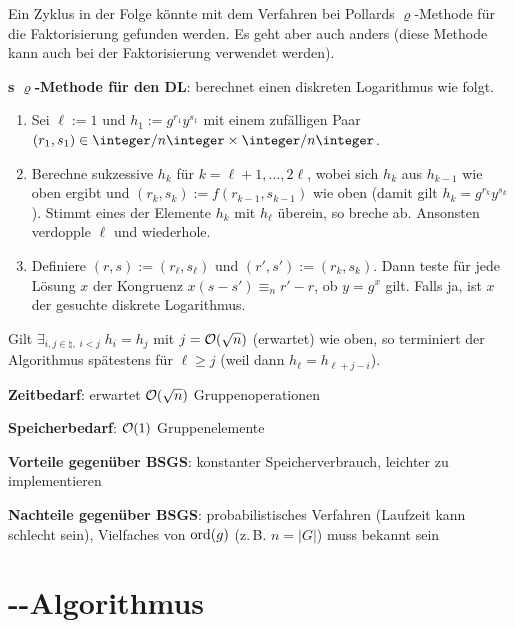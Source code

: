 \linie

Ein Zyklus in der Folge könnte mit dem Verfahren bei Pollards $\varrho$-Methode für die
Faktorisierung gefunden werden.
Es geht aber auch anders (diese Methode kann auch bei der Faktorisierung verwendet werden).

\textbf{s $\varrho$-Methode für den DL}:
 berechnet einen
diskreten Logarithmus wie folgt.
\begin{enumerate}
    \item
    Sei $\ell := 1$ und $h_1 := g^{r_1} y^{s_1}$ mit einem zufälligen Paar
    $(r_1, s_1) \in \ZnZ \times \ZnZ$.

    \item
    Berechne sukzessive $h_k$ für $k = \ell + 1, \dotsc, 2\ell$,
    wobei sich $h_k$ aus $h_{k-1}$ wie oben ergibt
    und $(r_k, s_k) := f(r_{k-1}, s_{k-1})$ wie oben
    (damit gilt $h_k = g^{r_k} y^{s_k}$).
    Stimmt eines der Elemente $h_k$ mit $h_\ell$ überein, so breche ab.
    Ansonsten verdopple $\ell$ und wiederhole.

    \item
    Definiere $(r, s) := (r_\ell, s_\ell)$ und $(r', s') := (r_k, s_k)$.
    Dann teste für jede Lösung $x$ der Kongruenz $x(s - s') \equiv_n r' - r$, ob $y = g^x$ gilt.
    Falls ja, ist $x$ der gesuchte diskrete Logarithmus.
\end{enumerate}
Gilt $\exists_{i, j \in \natural,\; i < j}\; h_i = h_j$ mit $j = \mathcal{O}(\sqrt{n})$ (erwartet)
wie oben, so terminiert der Algorithmus spätestens für $\ell \ge j$
(weil dann $h_\ell = h_{\ell+j-i}$).

\linie

\textbf{Zeitbedarf}:
erwartet $\mathcal{O}(\sqrt{n})$ Gruppenoperationen

\textbf{Speicherbedarf}:
$\mathcal{O}(1)$ Gruppenelemente

\linie

\textbf{Vorteile gegenüber BSGS}:
konstanter Speicherverbrauch,
leichter zu implementieren

\textbf{Nachteile gegenüber BSGS}:
probabilistisches Verfahren (Laufzeit kann schlecht sein),
Vielfaches von $\operatorname{ord}(g)$ (z.\,B. $n = |G|$) muss bekannt sein

\pagebreak

\section{%
    --Algorithmus%
}

